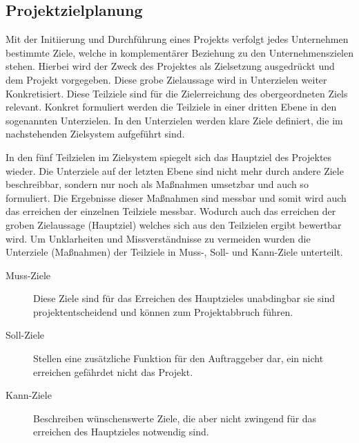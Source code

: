 \subsection{Projektzielplanung}
\label{sec:Projektzielplanung}

Mit der Initiierung und Durchführung eines Projekts verfolgt jedes Unternehmen
bestimmte Ziele, welche in komplementärer Beziehung zu den Unternehmenszielen
stehen.
Hierbei wird der Zweck des Projektes als Zielsetzung ausgedrückt und dem Projekt
vorgegeben. Diese  grobe Zielaussage wird in Unterzielen weiter Konkretisiert.
Diese Teilziele sind für die Zielerreichung des obergeordneten Ziels relevant.
Konkret formuliert werden die Teilziele in einer dritten Ebene in den
sogenannten Unterzielen. In den Unterzielen werden klare Ziele definiert, die
im nachstehenden Zielsystem aufgeführt sind.


In den fünf Teilzielen im Zielsystem spiegelt sich das Hauptziel des Projektes
wieder. Die Unterziele auf der letzten Ebene sind nicht mehr durch andere Ziele
beschreibbar, sondern nur noch als Maßnahmen umsetzbar und auch so formuliert.
Die Ergebnisse dieser Maßnahmen sind messbar und somit wird auch das erreichen
der einzelnen Teilziele messbar. Wodurch auch das erreichen der groben
Zielaussage (Hauptziel) welches sich aus den Teilzielen ergibt bewertbar wird.
Um Unklarheiten und Missverständnisse zu vermeiden wurden die Unterziele
(Maßnahmen) der Teilziele in Muss-, Soll- und Kann-Ziele unterteilt.

\begin{description}
\item[Muss-Ziele]
Diese Ziele sind für das Erreichen des Hauptzieles unabdingbar sie sind
projektentscheidend und können zum Projektabbruch führen.
\item[Soll-Ziele]
Stellen eine zusätzliche Funktion für den Auftraggeber dar, ein nicht erreichen
gefährdet nicht das Projekt.
\item[Kann-Ziele]
Beschreiben wünschenswerte Ziele, die aber nicht zwingend für das erreichen des
Hauptzieles notwendig sind.
\end{description}

